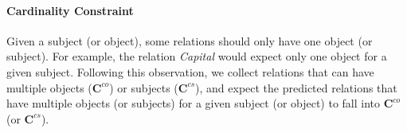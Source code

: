 
\paragraph{Cardinality Constraint}
Given a subject (or object), some relations should only have one object (or subject).
For example, the relation \emph{Capital} would expect only one object for a given subject.
Following this observation, we collect relations that can have multiple objects ($\textbf{C}^{co}$) or subjects ($\textbf{C}^{cs}$), and expect the predicted relations that have multiple objects (or subjects) for a given subject (or object) to fall into $\textbf{C}^{co}$ (or $\textbf{C}^{cs}$).


